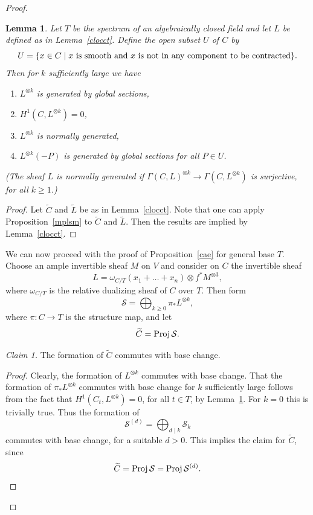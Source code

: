 \documentclass[11pt]{amsart}
\newtheorem{lem}[prop]{Lemma}
\theoremstyle{definition}
\theoremstyle{remark}
\newenvironment{pf}{\begin{proof}}{\end{proof}}
\newcommand{\rtext}[1]{\text{\upshape #1}}
\renewcommand{\tilde}{\widetilde}
\newcommand{\upst}{^{\ast}}
\newcommand{\lst}{_{\ast}}
\newcommand{\sS}{{\mathcal{S}}}
\renewcommand{\st}{\mathrel{\mid}}
\newcommand{\proj}{\operatorname{\rm Proj}\nolimits}
\theoremstyle{plain}
\theoremstyle{definition}
\theoremstyle{remark}
\begin{document}
\begin{pf}
\begin{lem} \label{tfll}
Let \(T\) be the spectrum of an algebraically closed field and let \(L\) be defined
as in Lemma~\ref{clocct}. Define the
open subset \(U\) of \(C\) by
\[
U=\{x\in C\st \rtext{\(x\) is smooth and \(x\) is not in any component to be
contracted}\}.
\]
Then for \(k\) sufficiently large we have
\begin{enumerate}
\item \(L^{\otimes k}\) is generated by global sections, \label{genglob}
\item \(H^1(C,L^{\otimes k})=0\),
\item \(L^{\otimes k}\) is normally generated, \label{normgen}
\item \(L^{\otimes k}(-P)\) is generated by global sections for all \(P\in U\).
\label{mpglob}
\end{enumerate}
(The sheaf \(L\) is normally generated if \(\Gamma(C,L)^{\otimes
k}\rightarrow\Gamma(C,L^{\otimes k})\) is surjective, for
all \(k\geq1\).)
\end{lem}
\begin{pf}
Let \(\tilde{C}\) and \(\tilde{L}\) be as in Lemma~\ref{clocct}. Note that one can
apply Proposition~\ref{mplsm} to
\(\tilde{C}\) and \(\tilde{L}\). Then the results are implied by
Lemma~\ref{clocct}.
\end{pf}

We can now proceed with the proof of Proposition~\ref{cae} for general base
\(T\). Choose an ample invertible sheaf \(M\) on
\(V\) and consider on \(C\) the invertible sheaf
\[
L=\omega_{C/T}(x_1+\ldots+x_n)\otimes f\upst M^{\otimes3},
\]
where \(\omega_{C/T}\) is the relative dualizing sheaf of \(C\) over \(T\).  Then
form
\[
\sS=\bigoplus_{k\geq0}\pi\lst L^{\otimes k},
\]
where \(\pi:C\rightarrow T\) is the structure map, and let
\[
\tilde{C}=\proj\sS.
\]

{\em Claim 1. }The formation of \(\tilde{C}\) commutes with base change.
\begin{pf}
Clearly, the formation of \(L^{\otimes k}\) commutes with base change.  That the
formation of \(\pi\lst L^{\otimes k}\)
commutes with base change for \(k\) sufficiently large follows from the fact that
\(H^1(C_t,L^{\otimes k})=0\), for all
\(t\in T\), by Lemma~\ref{tfll}. For \(k=0\) this is trivially true. Thus the
formation of
\[
\sS^{(d)}=\bigoplus_{d\mid k}\sS_k
\]
commutes with base change, for a suitable \(d>0\). This implies the claim for
\(\tilde{C}\), since
\[
\tilde{C}=\proj\sS=\proj\sS^{(d)}.\qed
\]
\renewcommand{\qed}{}\end{pf}


\end{pf}
\end{document}
